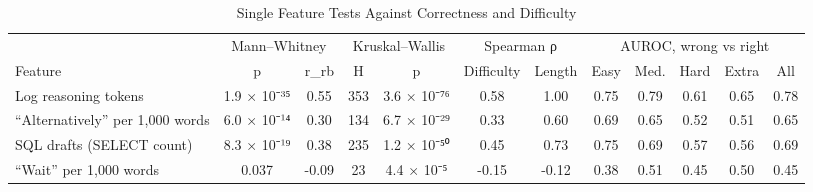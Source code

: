 \begin{table}[!htbp]
\centering
\caption{Single Feature Tests Against Correctness and Difficulty}
\label{tab:10}
\small
\begin{adjustbox}{max width=\linewidth}
\begin{tabular}{@{}lccccccccccc@{}}
\toprule
 & \multicolumn{2}{c}{Mann–Whitney} & \multicolumn{2}{c}{Kruskal–Wallis} & \multicolumn{2}{c}{Spearman ρ} & \multicolumn{5}{c}{AUROC, wrong vs right} \\
\cmidrule(lr){2-3}\cmidrule(lr){4-5}\cmidrule(lr){6-7}\cmidrule(lr){8-12}
Feature & p & r\_rb & H & p & Difficulty & Length & Easy & Med. & Hard & Extra & All \\
\midrule
Log reasoning tokens & 1.9 × 10⁻³⁵ & 0.55 & 353 & 3.6 × 10⁻⁷⁶ & 0.58 & 1.00 & 0.75 & 0.79 & 0.61 & 0.65 & 0.78 \\
``Alternatively'' per 1,000 words & 6.0 × 10⁻¹⁴ & 0.30 & 134 & 6.7 × 10⁻²⁹ & 0.33 & 0.60 & 0.69 & 0.65 & 0.52 & 0.51 & 0.65 \\
SQL drafts (SELECT count) & 8.3 × 10⁻¹⁹ & 0.38 & 235 & 1.2 × 10⁻⁵⁰ & 0.45 & 0.73 & 0.75 & 0.69 & 0.57 & 0.56 & 0.69 \\
``Wait'' per 1,000 words & 0.037 & -0.09 & 23 & 4.4 × 10⁻⁵ & -0.15 & -0.12 & 0.38 & 0.51 & 0.45 & 0.50 & 0.45 \\
\bottomrule
\end{tabular}
\end{adjustbox}
\par{}
\end{table}

